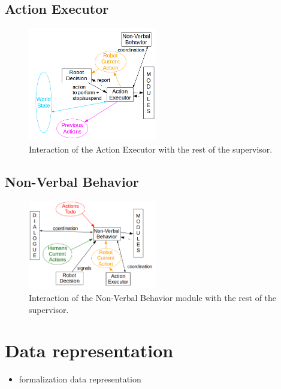 \documentclass[english,a4paper,11pt,twoside]{StyleThese}
\begin{document}
\subsection{Action Executor}

\begin{figure}[!h]
	\centering
    \includegraphics[width=0.5\textwidth]{figs/Chapter2/ActionExecutor.png}
    \caption{Interaction of the Action Executor with the rest of the supervisor.}
    \label{fig:actionExecutor}
\end{figure}

\subsection{Non-Verbal Behavior}

\begin{figure}[!h]
	\centering
    \includegraphics[width=0.5\textwidth]{figs/Chapter2/NVBehavior.png}
    \caption{Interaction of the Non-Verbal Behavior module with the rest of the supervisor.}
    \label{fig:NVBehavior}
\end{figure}

\section{Data representation}

\begin{itemize}
\item formalization data representation
\end{itemize}

\ifdefined{}
\else


\end{document}
